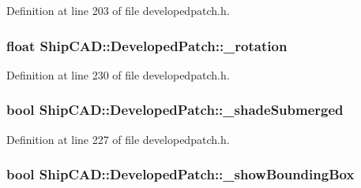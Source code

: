 Definition at line 203 of file developedpatch.\+h.

\subsubsection[{\texorpdfstring{\+\_\+rotation}{_rotation}}]{\setlength{\rightskip}{0pt plus 5cm}float Ship\+C\+A\+D\+::\+Developed\+Patch\+::\+\_\+rotation\hspace{0.3cm}{\ttfamily [protected]}}\hypertarget{classShipCAD_1_1DevelopedPatch_a811b2655727eb8af2e15e9eb48b54e89}{}\label{classShipCAD_1_1DevelopedPatch_a811b2655727eb8af2e15e9eb48b54e89}


Definition at line 230 of file developedpatch.\+h.

\subsubsection[{\texorpdfstring{\+\_\+shade\+Submerged}{_shadeSubmerged}}]{\setlength{\rightskip}{0pt plus 5cm}bool Ship\+C\+A\+D\+::\+Developed\+Patch\+::\+\_\+shade\+Submerged\hspace{0.3cm}{\ttfamily [protected]}}\hypertarget{classShipCAD_1_1DevelopedPatch_a85a8213cf1d96c9c1a959a67223971ea}{}\label{classShipCAD_1_1DevelopedPatch_a85a8213cf1d96c9c1a959a67223971ea}


Definition at line 227 of file developedpatch.\+h.

\subsubsection[{\texorpdfstring{\+\_\+show\+Bounding\+Box}{_showBoundingBox}}]{\setlength{\rightskip}{0pt plus 5cm}bool Ship\+C\+A\+D\+::\+Developed\+Patch\+::\+\_\+show\+Bounding\+Box\hspace{0.3cm}{\ttfamily [protected]}}\hypertarget{classShipCAD_1_1DevelopedPatch_a9f3f6d98182ef33bf1bef3bdacd41ecc}{}\label{classShipCAD_1_1DevelopedPatch_a9f3f6d98182ef33bf1bef3bdacd41ecc}


